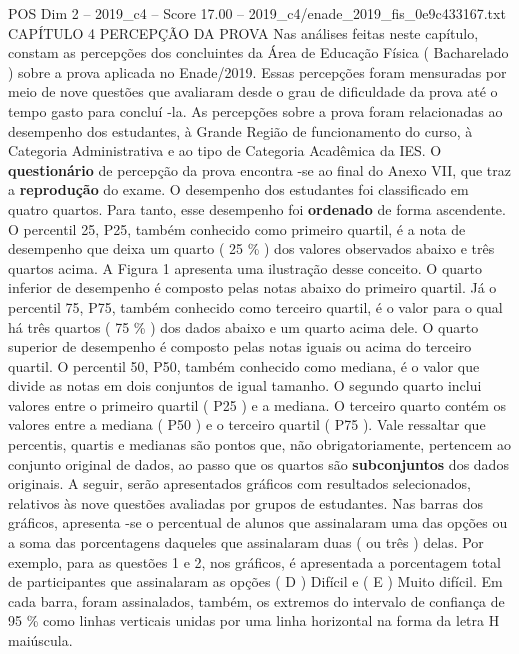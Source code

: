 \begin{textsample}{POS Dim 2 – 2019\_c4 – Score 17.00 – 2019\_c4/enade\_2019\_fis\_0e9c433167.txt}  \label{ex:f2_pos_046}
CAPÍTULO 4 PERCEPÇÃO DA PROVA Nas análises feitas neste capítulo, constam as percepções dos concluintes da Área de Educação Física ( Bacharelado ) sobre a prova aplicada no Enade/2019.
Essas percepções foram mensuradas por meio de nove questões que avaliaram desde o grau de dificuldade da prova até o tempo gasto para concluí -la.
As percepções sobre a prova foram relacionadas ao desempenho dos estudantes, à Grande Região de funcionamento do curso, à Categoria Administrativa e ao tipo de Categoria Acadêmica da IES.
O \textbf{questionário} de percepção da prova encontra -se ao final do Anexo VII, que traz a \textbf{reprodução} do exame.
O desempenho dos estudantes foi classificado em quatro quartos.
Para tanto, esse desempenho foi \textbf{ordenado} de forma ascendente.
O percentil 25, P25, também conhecido como primeiro quartil, é a nota de desempenho que deixa um quarto ( 25 \% ) dos valores observados abaixo e três quartos acima.
A Figura 1 apresenta uma ilustração desse conceito.
O quarto inferior de desempenho é composto pelas notas abaixo do primeiro quartil.
Já o percentil 75, P75, também conhecido como terceiro quartil, é o valor para o qual há três quartos ( 75 \% ) dos dados abaixo e um quarto acima dele.
O quarto superior de desempenho é composto pelas notas iguais ou acima do terceiro quartil.
O percentil 50, P50, também conhecido como mediana, é o valor que divide as notas em dois conjuntos de igual tamanho.
O segundo quarto inclui valores entre o primeiro quartil ( P25 ) e a mediana.
O terceiro quarto contém os valores entre a mediana ( P50 ) e o terceiro quartil ( P75 ).
Vale ressaltar que percentis, quartis e medianas são pontos que, não obrigatoriamente, pertencem ao conjunto original de dados, ao passo que os quartos são \textbf{subconjuntos} dos dados originais.
A seguir, serão apresentados gráficos com resultados selecionados, relativos às nove questões avaliadas por grupos de estudantes.
Nas barras dos gráficos, apresenta -se o percentual de alunos que assinalaram uma das opções ou a soma das porcentagens daqueles que assinalaram duas ( ou três ) delas.
Por exemplo, para as questões 1 e 2, nos gráficos, é apresentada a porcentagem total de participantes que assinalaram as opções ( D ) Difícil e ( E ) Muito difícil.
Em cada barra, foram assinalados, também, os extremos do intervalo de confiança de 95 \% como linhas verticais unidas por uma linha horizontal na forma da letra H maiúscula.

\end{textsample}
